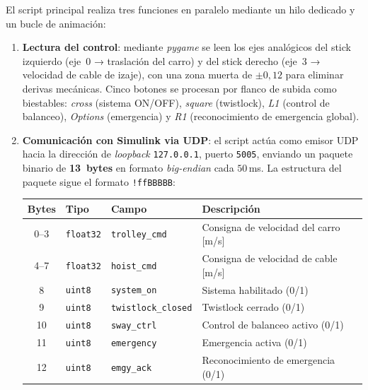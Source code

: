\documentclass[12pt, a4paper]{article}
\begin{document}
El script principal realiza tres funciones en paralelo mediante un hilo dedicado y
un bucle de animación:

\begin{enumerate}
    \item \textbf{Lectura del control}: mediante \textit{pygame} se leen los ejes
    analógicos del stick izquierdo (eje~0 → traslación del carro) y del stick derecho
    (eje~3 → velocidad de cable de izaje), con una zona muerta de $\pm 0{,}12$ para
    eliminar derivas mecánicas. Cinco botones se procesan por flanco de subida como
    biestables: \textit{cross} (sistema ON/OFF), \textit{square} (twistlock),
    \textit{L1} (control de balanceo), \textit{Options} (emergencia) y \textit{R1}
    (reconocimiento de emergencia global).

    \item \textbf{Comunicación con Simulink via UDP}: el script actúa como emisor UDP
    hacia la dirección de \textit{loopback} \texttt{127.0.0.1}, puerto \texttt{5005},
    enviando un paquete binario de \textbf{13~bytes} en formato \textit{big-endian} cada
    $50$\,ms. La estructura del paquete sigue el formato \texttt{!ffBBBBB}:

    \begin{center}
    \begin{tabular}{clll}
        \hline
        \textbf{Bytes} & \textbf{Tipo} & \textbf{Campo} & \textbf{Descripción} \\
        \hline
        0--3   & \texttt{float32} & \texttt{trolley\_cmd}      & Consigna de velocidad del carro [m/s] \\
        4--7   & \texttt{float32} & \texttt{hoist\_cmd}        & Consigna de velocidad de cable [m/s]  \\
        8      & \texttt{uint8}   & \texttt{system\_on}        & Sistema habilitado (0/1)              \\
        9      & \texttt{uint8}   & \texttt{twistlock\_closed} & Twistlock cerrado (0/1)               \\
        10     & \texttt{uint8}   & \texttt{sway\_ctrl}        & Control de balanceo activo (0/1)      \\
        11     & \texttt{uint8}   & \texttt{emergency}         & Emergencia activa (0/1)               \\
        12     & \texttt{uint8}   & \texttt{emgy\_ack}         & Reconocimiento de emergencia (0/1)    \\
        \hline
    \end{tabular}
    \end{center}


\end{enumerate}
\end{document}
